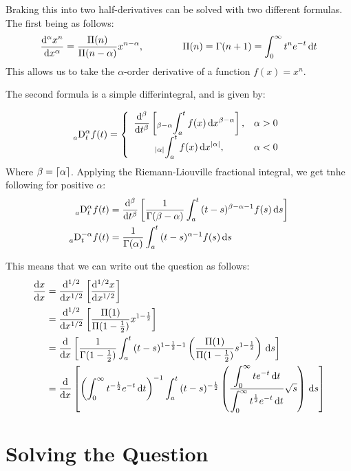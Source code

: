 \documentclass[a4paper, twoside]{article}
\begin{document}
Braking this into two half-derivatives can be solved with two different formulas. The first being as follows:
\[
    \ndiff{\alpha}{x^n}{x}=\frac{\Pi(n)}{\Pi(n-\alpha)}x^{n-\alpha}, \qquad \qquad \Pi(n)=\Gamma(n+1)=\Int{0}{\infty}{t^{n}e^{-t}}{t}
\]
This allows us to take the \(\alpha\)-order derivative of a function $f(x)=x^n$.

The second formula is a simple differintegral, and is given by:

\[
\EulerD{}{a}{\alpha}{t}f(t)=
    \left\{
        \begin{array}{cc}
            \displaystyle\ndiff{\beta}{}{t}\left[ \nfoldInt{\beta-\alpha}{a}{t}{f(x)}{x}\right], &  \alpha>0\\\displaystyle
            \nfoldInt{\modu{\alpha}}{a}{t}{f(x)}{x}, & \alpha<0
        \end{array}
    \right.
\]
Where \(\beta=\ceil{\alpha}\).
Applying the Riemann-Liouville fractional integral, we get tnhe following for positive \(\alpha\):
\begin{align*}
    \EulerD{}{a}{\alpha}{t}f(t)&=\ndiff{\beta}{}{t}\left[\frac{1}{\Gamma(\beta-\alpha)}\Int{a}{t}{(t-s)^{\beta-\alpha-1}f(s)}{s}\right]\\
    \EulerD{}{a}{-\alpha}{t}f(t)&=\frac{1}{\Gamma(\alpha)}\Int{a}{t}{(t-s)^{\alpha-1}f(s)}{s}
\end{align*}

This means that we can write out the question as follows:
\begin{align*}
    \diff{x}{x}&=\ndiff{1/2}{}{x}\left[\ndiff{1/2}{x}{x}\right]\\
    &=\ndiff{1/2}{}{x}\left[\frac{\Pi(1)}{\Pi(1-\frac{1}{2})}x^{1-\frac{1}{2}}\right]\\
    &=\diff{}{x}\left[\frac{1}{\Gamma(1-\frac{1}{2})}\Int{a}{t}{(t-s)^{1-\frac{1}{2}-1}\left(
    \frac{\Pi(1)}{\Pi(1-\frac{1}{2})}s^{1-\frac{1}{2}}
    \right)}{s}\right]\\
    &=\diff{}{x}\left[\left(
    \Int{0}{\infty}{t^{-\frac{1}{2}}e^{-t}}{t}
    \right)^{-1}\Int{a}{t}{(t-s)^{-\frac{1}{2}}\left(
    \frac{\displaystyle
    \Int{0}{\infty}{te^{-t}}{t}
    }{\displaystyle
    \Int{0}{\infty}{t^{\frac{1}{2}}e^{-t}}{t}
    }\sqrt{s}
    \right)}{s}\right]
\end{align*}
\newpage





\section{Solving the Question}
\end{document}
